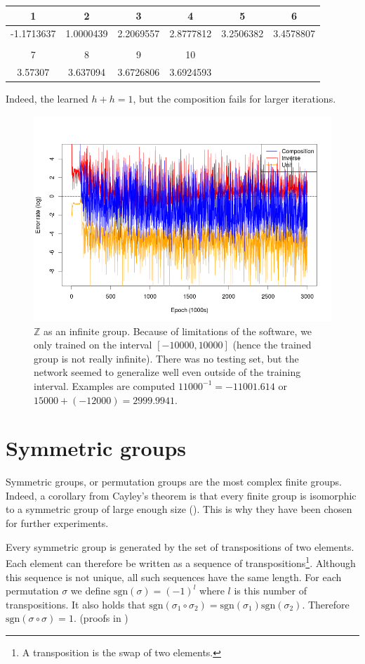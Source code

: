 \begin{tabular}{cccccc}
1&2&3&4&5&6\\
\hline
-1.1713637&1.0000439&2.2069557&2.8777812&3.2506382&3.4578807\\
 \\
7&8&9&10\\
\hline 
3.57307&3.637094&3.6726806&3.6924593
\end{tabular}

Indeed, the learned $h+h=1$, but the composition fails for larger iterations.
\begin{figure}
\caption{$\mathbb{Z}$ as an infinite group. Because of limitations of the software, we only trained on the interval $[-10000,10000]$ (hence the trained group is not really infinite). There was no testing set, but the network seemed to generalize well even outside of the training interval. Examples are computed $11000^{-1}=-11001.614$ or $15000+(-12000)=2999.9941$.}
\centering
\label{graph:z_inf}
\includegraphics[width=\linewidth]{../img/z_inf.png}
\end{figure}

\section{Symmetric groups}
Symmetric groups, or permutation groups are the most complex finite groups. Indeed, a corollary from Cayley's theorem  is that every finite group is isomorphic to a symmetric group of large enough size (\cite{cayley}). This is why they have been chosen for further experiments.

Every symmetric group is generated by the set of transpositions of two elements. Each element can therefore be written as a sequence of transpositions\footnote{A transposition is the swap of two elements.}. Although this sequence is not unique, all such sequences have the same length. For each permutation $\sigma$ we define $\text{sgn}(\sigma)=(-1)^l$ where $l$ is this number of transpositions. It also holds that $\text{sgn}(\sigma_1\circ\sigma_2)=\text{sgn}(\sigma_1)\text{sgn}(\sigma_2)$. Therefore $\text{sgn}(\sigma\circ\sigma)=1$. (proofs in \cite{Lingebra})

